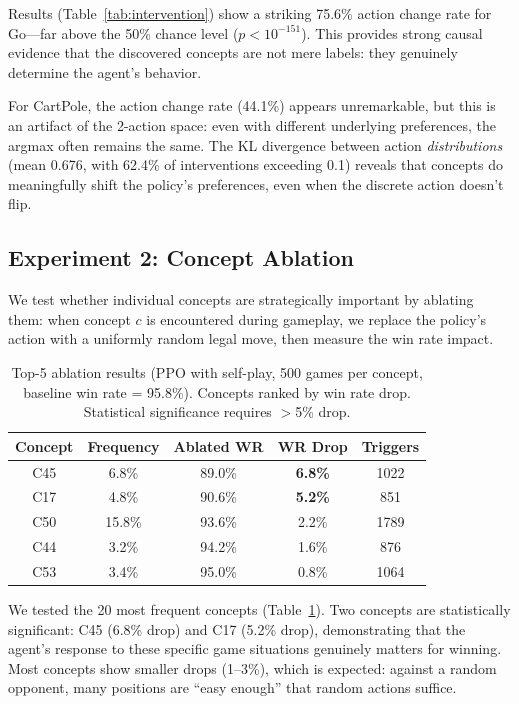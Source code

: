 \documentclass[11pt,a4paper]{article}
\begin{document}
Results (Table~\ref{tab:intervention}) show a striking 75.6\% action change rate for Go---far above the 50\% chance level ($p < 10^{-151}$). This provides strong causal evidence that the discovered concepts are not mere labels: they genuinely determine the agent's behavior.

For CartPole, the action change rate (44.1\%) appears unremarkable, but this is an artifact of the 2-action space: even with different underlying preferences, the argmax often remains the same. The KL divergence between action \emph{distributions} (mean 0.676, with 62.4\% of interventions exceeding 0.1) reveals that concepts do meaningfully shift the policy's preferences, even when the discrete action doesn't flip.

\subsection{Experiment 2: Concept Ablation}
\label{sec:ablation}

We test whether individual concepts are strategically important by ablating them: when concept $c$ is encountered during gameplay, we replace the policy's action with a uniformly random legal move, then measure the win rate impact.

\begin{table}[t]
\centering
\caption{Top-5 ablation results (PPO with self-play, 500 games per concept, baseline win rate = 95.8\%). Concepts ranked by win rate drop. Statistical significance requires $>$5\% drop.}
\label{tab:ablation}
\begin{tabular}{ccccc}
\toprule
\textbf{Concept} & \textbf{Frequency} & \textbf{Ablated WR} & \textbf{WR Drop} & \textbf{Triggers} \\
\midrule
C45 & 6.8\% & 89.0\% & \textbf{6.8\%} & 1022 \\
C17 & 4.8\% & 90.6\% & \textbf{5.2\%} & 851 \\
C50 & 15.8\% & 93.6\% & 2.2\%          & 1789 \\
C44 & 3.2\% & 94.2\% & 1.6\%           & 876 \\
C53 & 3.4\% & 95.0\% & 0.8\%           & 1064 \\
\bottomrule
\end{tabular}
\end{table}

We tested the 20 most frequent concepts (Table~\ref{tab:ablation}). Two concepts are statistically significant: C45 (6.8\% drop) and C17 (5.2\% drop), demonstrating that the agent's response to these specific game situations genuinely matters for winning. Most concepts show smaller drops (1--3\%), which is expected: against a random opponent, many positions are ``easy enough'' that random actions suffice.
\end{document}
